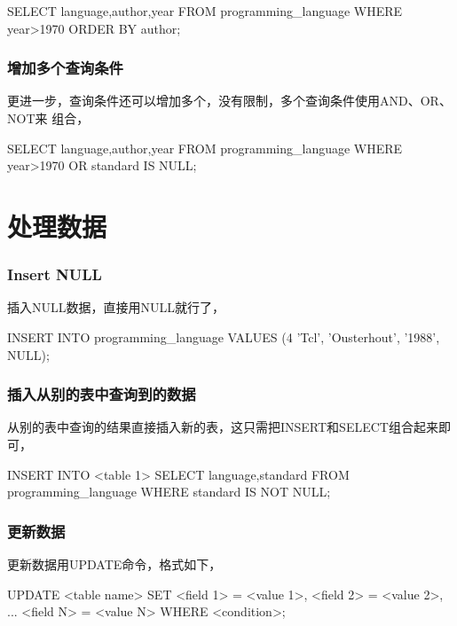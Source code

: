 \documentclass[a4paper,11pt]{article}
\begin{document}
\begin{sqlcode}
SELECT language,author,year FROM programming_language
    WHERE year>1970 ORDER BY author;
\end{sqlcode}

\section[增加多个查询条件]{增加多个查询条件}
更进一步，查询条件还可以增加多个，没有限制，多个查询条件使用AND、OR、NOT来
组合，

\begin{sqlcode}
SELECT language,author,year FROM programming_language
    WHERE year>1970 OR standard IS NULL;
\end{sqlcode}


\part[处理数据]{处理数据}
\section[Insert NULL]{Insert NULL}
插入NULL数据，直接用NULL就行了，

\begin{sqlcode}
INSERT INTO programming_language VALUES (4 'Tcl', 'Ousterhout', '1988', NULL);
\end{sqlcode}

\section[插入从别的表中查询到的数据]{插入从别的表中查询到的数据}
从别的表中查询的结果直接插入新的表，这只需把INSERT和SELECT组合起来即可，

\begin{sqlcode}
INSERT INTO <table 1> SELECT language,standard FROM programming_language
    WHERE standard IS NOT NULL;
\end{sqlcode}

\section[更新数据]{更新数据}
更新数据用UPDATE命令，格式如下，

\begin{sqlcode}
UPDATE <table name> SET
<field 1> = <value 1>,
<field 2> = <value 2>,
...
<field N> = <value N>
WHERE <condition>;
\end{sqlcode}
\end{document}
